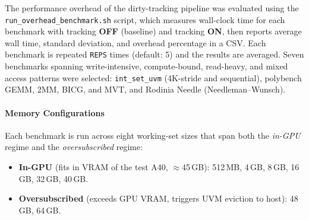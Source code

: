 The performance overhead of the dirty-tracking pipeline was evaluated using the
\texttt{run\_overhead\_benchmark.sh} script, which measures wall-clock time for
each benchmark with tracking \textbf{OFF} (baseline) and tracking \textbf{ON},
then reports average wall time, standard deviation, and overhead percentage
in a CSV.
Each benchmark is repeated \texttt{REPS} times (default: 5) and the
results are averaged.
Seven benchmarks spanning write-intensive, compute-bound, read-heavy, and
mixed access patterns were selected:
\texttt{int\_set\_uvm} (4K-stride and sequential),
polybench GEMM, 2MM, BICG, and MVT,
and Rodinia Needle (Needleman--Wunsch).

\paragraph{Memory Configurations}
Each benchmark is run across eight working-set sizes that span
both the \emph{in-GPU} regime and the \emph{oversubscribed} regime:

\begin{itemize}
    \item \textbf{In-GPU} (fits in VRAM of the test A40, $\approx$45\,GB):
          512\,MB, 4\,GB, 8\,GB, 16\,GB, 32\,GB, 40\,GB.
    \item \textbf{Oversubscribed} (exceeds GPU VRAM, triggers UVM eviction to host):
          48\,GB, 64\,GB.
\end{itemize}



